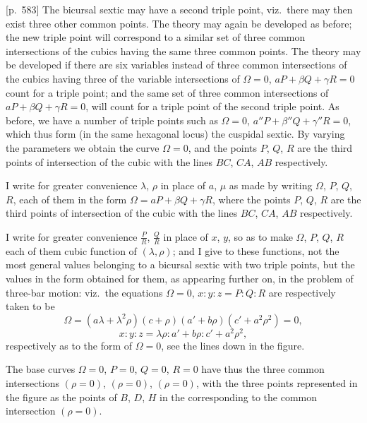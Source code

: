 \documentclass[11pt,a4paper]{article}
\theoremstyle{plain}
\theoremstyle{definition}
\theoremstyle{remark}
\begin{document}
[p.~583] The bicursal sextic may have a second triple point, viz.\ there may then exist three other common points. The theory may again be developed as before; the new triple point will correspond to a similar set of three common intersections of the cubics having the same three common points. The theory may be developed if there are six variables instead of three common intersections of the cubics having three of the variable intersections of $\Omega = 0$, $aP + \beta Q + \gamma R = 0$ count for a triple point; and the same set of three common intersections of $aP + \beta Q + \gamma R = 0$, will count for a triple point of the second triple point. As before, we have a number of triple points such as $\Omega = 0$, $a''P + \beta''Q + \gamma''R = 0$, which thus form (in the same hexagonal locus) the cuspidal sextic. By varying the parameters we obtain the curve $\Omega = 0$, and the points $P$, $Q$, $R$ are the third points of intersection of the cubic with the lines $BC$, $CA$, $AB$ respectively.

I write for greater convenience $\lambda$, $\rho$ in place of $a$, $\mu$ as made by writing $\Omega$, $P$, $Q$, $R$, each of them in the form $\Omega = aP + \beta Q + \gamma R$, where the points $P$, $Q$, $R$ are the third points of intersection of the cubic with the lines $BC$, $CA$, $AB$ respectively.

I write for greater convenience $\frac{P}{R}$, $\frac{Q}{R}$ in place of $x$, $y$, so as to make $\Omega$, $P$, $Q$, $R$ each of them cubic function of $(\lambda, \rho)$; and I give to these functions, not the most general values belonging to a bicursal sextic with two triple points, but the values in the form obtained for them, as appearing further on, in the problem of three-bar motion: viz.\ the equations $\Omega = 0$, $x : y : z = P : Q : R$ are respectively taken to be
\[
\Omega = (a\lambda + \lambda^2\rho)(c + \rho)(a' + b\rho)(c' + a^2\rho^2) = 0,
\]
\[
x : y : z = \lambda\rho : a' + b\rho : c' + a^2\rho^2,
\]
respectively as to the form of $\Omega = 0$, see the lines down in the figure.

The base curves $\Omega = 0$, $P = 0$, $Q = 0$, $R = 0$ have thus the three common intersections
$(\rho = 0)$, $(\rho = 0)$, $(\rho = 0)$, with the three points represented in the figure as the points of $B$, $D$, $H$ in the corresponding to the common intersection $(\rho = 0)$.

\bigskip
\end{document}
